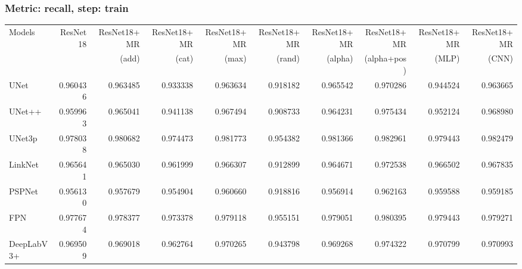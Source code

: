 \documentclass{article}
\begin{document}
\subsubsection{Metric: recall, step: train}
\begin{tabular}{lrrrrrrrrr}
\toprule
Models & ResNet18 & ResNet18+MR & ResNet18+MR & ResNet18+MR & ResNet18+MR & ResNet18+MR & ResNet18+MR & ResNet18+MR & ResNet18+MR \\
       &          &       (add) &       (cat) &       (max) &      (rand) &     (alpha) & (alpha+pos) &       (MLP) &       (CNN) \\
\midrule
UNet & 0.960436 & 0.963485 & 0.933338 & 0.963634 & 0.918182 & 0.965542 & 0.970286 & 0.944524 & 0.963665 \\
UNet++ & 0.959963 & 0.965041 & 0.941138 & 0.967494 & 0.908733 & 0.964231 & 0.975434 & 0.952124 & 0.968980 \\
UNet3p & 0.978038 & 0.980682 & 0.974473 & 0.981773 & 0.954382 & 0.981366 & 0.982961 & 0.979443 & 0.982479 \\
LinkNet & 0.965641 & 0.965030 & 0.961999 & 0.966307 & 0.912899 & 0.964671 & 0.972538 & 0.966502 & 0.967835 \\
PSPNet & 0.956130 & 0.957679 & 0.954904 & 0.960660 & 0.918816 & 0.956914 & 0.962163 & 0.959588 & 0.959185 \\
FPN & 0.977674 & 0.978377 & 0.973378 & 0.979118 & 0.955151 & 0.979051 & 0.980395 & 0.979443 & 0.979271 \\
DeepLabV3+ & 0.969509 & 0.969018 & 0.962764 & 0.970265 & 0.943798 & 0.969268 & 0.974322 & 0.970799 & 0.970993 \\
\bottomrule
\end{tabular}
\end{document}
